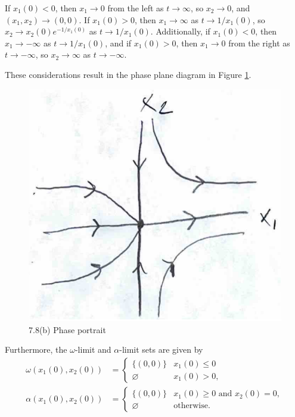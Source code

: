\documentclass[nonumber]{homework}
\begin{document}
	If $x_1(0) < 0$, then $x_1 \to 0$ from the left as $t \to \infty$, so $x_2 \to 0$, and $(x_1,x_2) \to (0,0)$. If $x_1(0) > 0$, then $x_1 \to \infty$ as $t\to 1/x_1(0)$, so $x_2 \to x_2(0)e^{-1/x_1(0)}$ as $t\to 1/x_1(0)$. Additionally, if $x_1(0) <0$, then $x_1 \to  -\infty$ as $t \to 1/x_1(0)$, and if $x_1(0) > 0$, then $x_1 \to 0$ from the right as $t\to- \infty$, so $x_2 \to \infty$ as $t \to -\infty$.
	
	These considerations result in the phase plane diagram in Figure \ref{fig:78b}.
	\begin{figure}[h]
		\centering
		\includegraphics[width=.6\textwidth]{p78b.png}
		\caption{7.8(b) Phase portrait}
		\label{fig:78b}
	\end{figure}
	Furthermore, the $\omega$-limit and $\alpha$-limit sets are given by
	\begin{align*}
		\omega(x_1(0),x_2(0)) &= \begin{cases}
			\{(0,0)\} & x_1(0) \le 0 \\
			\varnothing & x_1(0) > 0,
		\end{cases}\\[0.5em]
		\alpha(x_1(0), x_2(0)) &= \begin{cases}
			\{(0,0)\} & x_1(0)\ge 0 \text{ and } x_2(0) = 0, \\
			\varnothing & \text{otherwise}.
		\end{cases}
	\end{align*}
	
	
\end{document}
